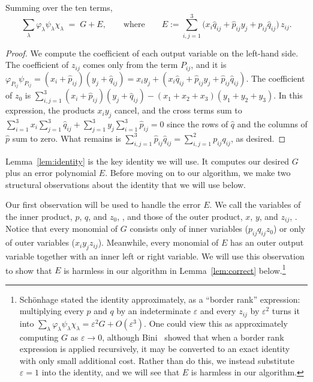 \begin{lemma}\label{lem:identity}
Summing over the ten terms,
\[
\sum_{\lambda}\varphi_\lambda\psi_\lambda\chi_\lambda \;=\; G+E,\qquad\text{where}\qquad
E:=\sum_{i,j=1}^{3}\big(x_i\hat q_{ij}+\hat p_{ij}y_j+\hat p_{ij}\hat q_{ij}\big)\,z_{ij}.
\]
\end{lemma}

\begin{proof}
We compute the coefficient of each output variable on the left-hand side. The coefficient of $z_{ij}$ comes only from the term $P_{ij}$, and it is $\varphi_{P_{ij}} \psi_{P_{ij}} = (x_i+\hat p_{ij})(y_j+\hat q_{ij})=x_iy_j+(x_i\hat q_{ij}+\hat p_{ij}y_j+\hat p_{ij}\hat q_{ij})$. The coefficient of $z_0$ is $\sum_{i,j=1}^{3}(x_i+\hat p_{ij})(y_j+\hat q_{ij})-(x_1+x_2+x_3)(y_1+y_2+y_3)$. In this expression, the products $x_iy_j$ cancel, and the cross terms sum to $\sum_{i=1}^{3}x_i\sum_{j=1}^{3}\hat q_{ij}+\sum_{j=1}^{3}y_j\sum_{i=1}^{3}\hat p_{ij}=0$ since the rows of $\hat q$ and the columns of $\hat p$ sum to zero. What remains is $\sum_{i,j=1}^{3}\hat p_{ij}\hat q_{ij}=\sum_{i,j=1}^{2}p_{ij}q_{ij}$, as desired.
\end{proof}

Lemma~\ref{lem:identity} is the key identity we will use. It computes our desired $G$ plus an error polynomial $E$. Before moving on to our algorithm, we make two structural observations about the identity that we will use below.

Our first observation will be used to handle the error $E$. We call the variables of the inner product, $p$, $q$, and $z_0$, , and those of the outer product, $x$, $y$, and $z_{ij}$, . Notice that every monomial of $G$ consists only of inner variables ($p_{ij}q_{ij}z_0$) or only of outer variables ($x_iy_jz_{ij}$). Meanwhile, every monomial of $E$ has an outer output variable together with an inner left or right variable. We will use this observation to show that $E$ is harmless in our algorithm in Lemma~\ref{lem:correct} below.\footnote{Sch\"onhage stated the identity approximately, as a ``border rank'' expression: multiplying every $p$ and $q$ by an indeterminate $\varepsilon$ and every $z_{ij}$ by $\varepsilon^2$ turns it into $\sum_\lambda\varphi_\lambda\psi_\lambda\chi_\lambda=\varepsilon^2G+O(\varepsilon^3)$. One could view this as approximately computing $G$ as $\varepsilon \to 0$, although Bini~\cite{Bin80} showed that when a border rank expression is applied recursively, it may be converted to an exact identity with only small additional cost.  Rather than do this, we instead substitute $\varepsilon = 1$ into the identity, and we will see that $E$ is harmless in our algorithm.}

